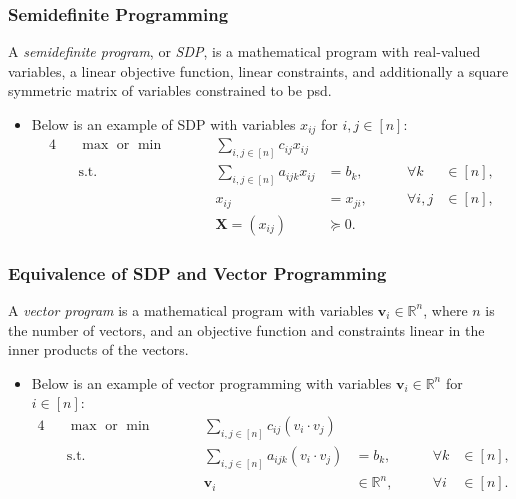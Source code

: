 \documentclass{beamer}
\newcommand{\RR}{\mathbb{R}}
\begin{document}
    \begin{frame}
        \frametitle{Semidefinite Programming}
    
        \begin{definition}
            A \emph{semidefinite program}, or \emph{SDP}, is a mathematical program with real-valued variables, a linear objective function, linear constraints, and additionally a square symmetric matrix of variables constrained to be psd.
        \end{definition}

        \pause

        \begin{itemize}
            \item Below is an example of SDP with variables $x_{ij}$ for $i, j \in [n]$:
            \begin{alignat}{4}
                && \max \text{ or } \min \qquad && \sum_{i, j \in [n]} c_{ij} x_{ij} \label{example:sdp} \\
                && \text{s.t.} \qquad && \sum_{i, j \in [n]} a_{ijk} x_{ij} &= b_k, & \qquad \forall k & \in [n], \nonumber \\
                && && x_{ij} &= x_{ji}, & \qquad \forall i, j & \in [n], \nonumber \\
                && && \mathbf X = \left(x_{ij}\right) & \succeq 0. \nonumber
              \end{alignat}
        \end{itemize}
    \end{frame}

    \begin{frame}
        \frametitle{Equivalence of SDP and Vector Programming}
    
        \begin{definition}
            A \emph{vector program} is a mathematical program with variables $\mathbf v_i \in \RR^n$, where $n$ is the number of vectors, and an objective function and constraints linear in the inner products of the vectors.
        \end{definition}

        \pause

        \begin{itemize}
            \item Below is an example of vector programming with variables $\mathbf v_i \in \RR^n$ for $i \in [n]$:
            \begin{alignat}{4}
                && \max \text{ or } \min \qquad && \sum_{i, j \in [n]} c_{ij} \left(v_i \cdot v_j\right) \label{example:vector-program} \\
                && \text{s.t.} \qquad && \sum_{i, j \in [n]} a_{ijk} \left(v_i \cdot v_j\right) &= b_k, & \qquad \forall k & \in [n], \nonumber \\
                && && \mathbf v_i &\in \RR^n, & \qquad \forall i & \in [n]. \nonumber
              \end{alignat}
        \end{itemize}
    \end{frame}
\end{document}
